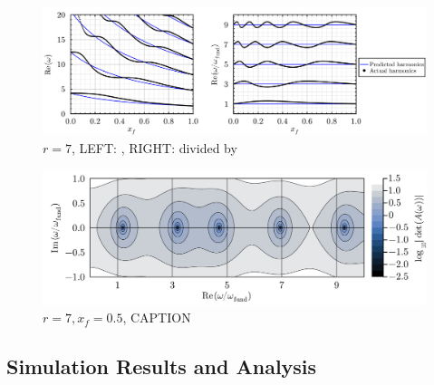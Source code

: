 \begin{figure}[t]
\centering
\includegraphics[scale=0.35]{assets/graphs/r=7_harmonics_both.pdf}
\caption{$r = 7$, LEFT: , RIGHT: divided by }
\label{fig:flame-harmonics}
\end{figure}

\begin{figure}[t]
\centering
\includegraphics[scale=0.35]{assets/graphs/r=7_xf=05_complex_harmonics.pdf}
\caption{$r = 7, x_f = 0.5$, CAPTION}
\label{fig:flame-harmonics-complex}
\end{figure}






\subsection{Simulation Results and Analysis}

